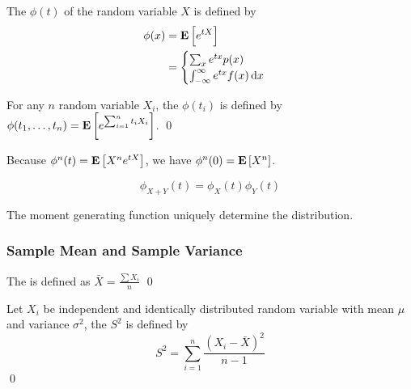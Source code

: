\begin{definition}
    The  $\phi(t)$ of the random variable $X$ is defined by
    \begin{equation}
        \begin{aligned}
            \phi(x) &= \expect{e^{tX}} \\
            &= \begin{cases}
                \sum_x e^{tx} p(x)\\
                \int_{-\infty}^\infty e^{tx} f(x) \dif{x}
            \end{cases}
        \end{aligned}
    \end{equation}
    
    For any $n$ random variable $X_i$, the  $\phi(t_i)$ is defined by $\phi(t_1, \dots, t_n) = \mathop{\bf E\/} \left[  e^{ \sum_{i=1}^n t_i X_i} \right]$.
    \qed
\end{definition}

Because $\phi^n (t) = \mathop{\bf E\/} \left[ X^n e^{tX} \right]$, we have $\phi^n(0) = \mathop{\bf E\/} \left[ X^n \right]$.

\begin{theorem}
    \begin{equation}
        \phi_{X+Y}(t) = \phi_X(t) \phi_Y(t)
    \end{equation}    
\end{theorem}

\begin{theorem}
The moment generating function uniquely determine the distribution.    
\end{theorem}




\subsubsection{Sample Mean and Sample Variance}

\begin{definition}
    The  is defined as $\bar{X} = \frac{\sum X_i}{n}$ \qed
\end{definition}

\begin{definition}
    Let $X_i$ be independent and identically distributed random variable with mean $\mu$ and variance $\sigma^2$, the  $S^2$ is defined by 
\begin{equation}
    S^2 = \sum_{i=1}^n \displaystyle \frac{(X_i - \bar{X})^2}{n - 1}
\end{equation} 
\qed
\end{definition}

